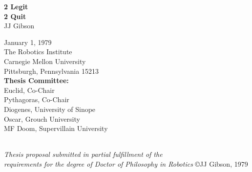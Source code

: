 \thispagestyle{empty}
\date{}

\begin{center}

{\Huge \bf 2 Legit \\ 2 Quit} \\
\vspace{1cm}  
{\Large JJ Gibson} \\
\vspace{1cm} 


{\Large January 1, 1979} \\
\vspace{2cm}
{\Large
The Robotics Institute\\
Carnegie Mellon University\\
Pittsburgh, Pennsylvania 15213\\
}
\vspace{1cm}
{\Large
{\bf Thesis Committee:}\\
Euclid, Co-Chair \\
Pythagoras, Co-Chair \\
Diogenes, University of Sinope \\
Oscar, Grouch University \\
MF Doom, Supervillain University\\
}
\vspace{2cm}
\par ~ \\
{\large \it Thesis proposal submitted in partial fulfillment of the \\
    requirements for the degree of Doctor of Philosophy in Robotics}
\vfill
{\large \copyright JJ Gibson, 1979}
\end{center}


